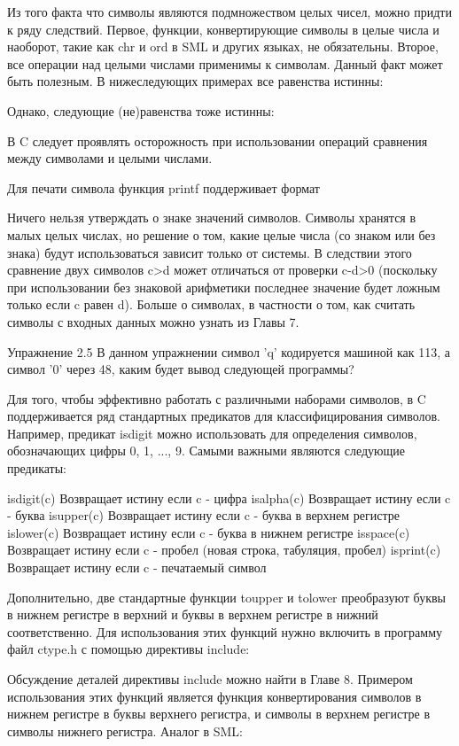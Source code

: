 Из того факта что символы являются подмножеством целых чисел, можно придти к ряду следствий. Первое, функции, конвертирующие символы в целые числа и наоборот, такие как chr и ord в SML и других языках, не обязательны. Второе, все операции над целыми числами применимы к символам. Данный факт может быть полезным. В нижеследующих примерах все равенства истинны:

Однако, следующие (не)равенства тоже истинны:

В C следует проявлять осторожность при использовании операций сравнения между символами и целыми числами.

Для печати символа функция printf поддерживает формат %

Ничего нельзя утверждать о знаке значений символов. Символы хранятся в малых целых числах, но решение о том, какие целые числа (со знаком или без знака) будут использоваться зависит только от системы. В следствии этого сравнение двух символов c>d может отличаться от проверки c-d>0 (поскольку при использовании без знаковой арифметики последнее значение будет ложным только если c равен d). Больше о символах, в частности о том, как считать символы с входных данных можно узнать из Главы 7.

Упражнение 2.5 В данном упражнении символ 'q' кодируется машиной как 113, а символ '0' через 48, каким будет вывод следующей программы?

Для того, чтобы эффективно работать с различными наборами символов, в C поддерживается ряд стандартных предикатов для классифицирования символов. Например, предикат isdigit можно использовать для определения символов, обозначающих цифры 0, 1, ..., 9. Самыми важными являются следующие предикаты:

isdigit(c) Возвращает истину если c - цифра
isalpha(c) Возвращает истину если c - буква
isupper(c) Возвращает истину если c - буква в верхнем регистре
islower(c) Возвращает истину если c - буква в нижнем регистре
isspace(c) Возвращает истину если c - пробел (новая строка, табуляция, пробел)
isprint(c) Возвращает истину если c - печатаемый символ

Дополнительно, две стандартные функции toupper и tolower преобразуют буквы в нижнем регистре в верхний и буквы в верхнем регистре в нижний соответственно. Для использования этих функций нужно включить в программу файл ctype.h с помощью директивы include:

Обсуждение деталей директивы include можно найти в Главе 8. Примером использования этих функций является функция конвертирования символов в нижнем регистре в буквы верхнего регистра, и символы в верхнем регистре в символы нижнего регистра. Аналог в SML:

